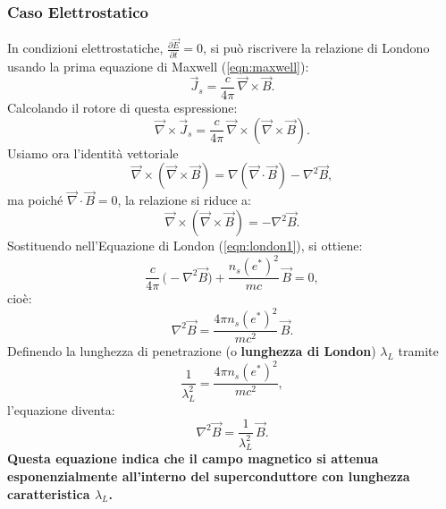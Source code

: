 \subsubsection*{Caso Elettrostatico}
In condizioni elettrostatiche, \(\frac{\partial \vec{E}}{\partial t}=0\), si può riscrivere la relazione di Londono usando la prima equazione di Maxwell (\ref{eqn:maxwell}):
\[
\vec{J}_s = \frac{c}{4\pi}\, \vec{\nabla} \times \vec{B}.
\]
Calcolando il rotore di questa espressione:
\[
\vec{\nabla} \times \vec{J}_s = \frac{c}{4\pi}\, \vec{\nabla} \times (\vec{\nabla} \times \vec{B}).
\]
Usiamo ora l'identità vettoriale
\[
\vec{\nabla} \times (\vec{\nabla} \times \vec{B}) = \nabla(\vec{\nabla} \cdot \vec{B}) - \nabla^2 \vec{B},
\]
ma poiché \(\vec{\nabla} \cdot \vec{B}=0\), la relazione si riduce a:
\[
\vec{\nabla} \times (\vec{\nabla} \times \vec{B}) = -\nabla^2 \vec{B}.
\]
Sostituendo nell'Equazione di London (\ref{eqn:london1}), si ottiene:
\[
\frac{c}{4\pi} \, \bigl(-\nabla^2 \vec{B}\bigr) + \frac{n_s (e^*)^2}{mc}\, \vec{B} = 0,
\]
cioè:
\[
\nabla^2 \vec{B} = \frac{4\pi n_s (e^*)^2}{mc^2}\, \vec{B}.
\]
Definendo la lunghezza di penetrazione (o \textbf{lunghezza di London}) \(\lambda_L\) tramite
\[
\frac{1}{\lambda_L^2} = \frac{4\pi n_s (e^*)^2}{mc^2},
\]
l'equazione diventa:
\begin{equation}
    \nabla^2 \vec{B} = \frac{1}{\lambda_L^2}\, \vec{B}.
    \label{eqn:london2}
\end{equation}
\textbf{Questa equazione indica che il campo magnetico si attenua esponenzialmente all'interno del superconduttore con lunghezza caratteristica \(\lambda_L\).}

